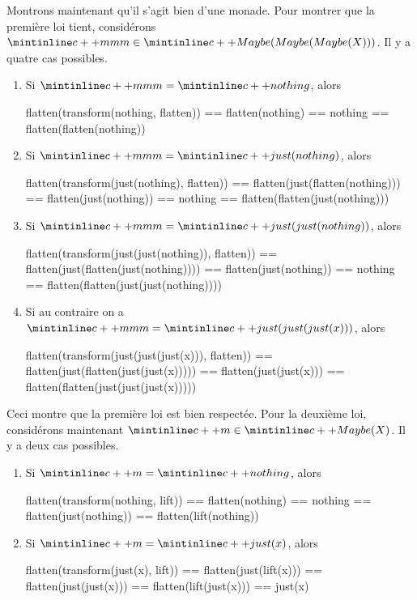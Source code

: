 Montrons maintenant qu'il s'agit bien d'une monade. Pour montrer que la
première loi tient, considérons $\cc{mmm} \in \cc{Maybe(Maybe(Maybe(X)))}$.
Il y a quatre cas possibles.
\begin{enumerate}
    \item Si $\cc{mmm} = \cc{nothing}$, alors
    \begin{cpp}
        flatten(transform(nothing, flatten))
            == flatten(nothing)
            == nothing
            == flatten(flatten(nothing))
    \end{cpp}

    \item Si $\cc{mmm} = \cc{just(nothing)}$, alors
    \begin{cpp}
        flatten(transform(just(nothing), flatten))
            == flatten(just(flatten(nothing)))
            == flatten(just(nothing))
            == nothing
            == flatten(flatten(just(nothing)))
    \end{cpp}

    \item Si $\cc{mmm} = \cc{just(just(nothing))}$, alors
    \begin{cpp}
        flatten(transform(just(just(nothing)), flatten))
            == flatten(just(flatten(just(nothing))))
            == flatten(just(nothing))
            == nothing
            == flatten(flatten(just(just(nothing))))
    \end{cpp}

    \item Si au contraire on a $\cc{mmm} = \cc{just(just(just(x)))}$, alors
    \begin{cpp}
        flatten(transform(just(just(just(x))), flatten))
            == flatten(just(flatten(just(just(x)))))
            == flatten(just(just(x)))
            == flatten(flatten(just(just(just(x)))))
    \end{cpp}
\end{enumerate}

Ceci montre que la première loi est bien respectée. Pour la deuxième loi,
considérons maintenant $\cc{m} \in \cc{Maybe(X)}$. Il y a deux cas possibles.
\begin{enumerate}
    \item Si $\cc{m} = \cc{nothing}$, alors
    \begin{cpp}
        flatten(transform(nothing, lift)) == flatten(nothing)
                                          == nothing
                                          == flatten(just(nothing))
                                          == flatten(lift(nothing))
    \end{cpp}

    \item Si $\cc{m} = \cc{just(x)}$, alors
    \begin{cpp}
        flatten(transform(just(x), lift)) == flatten(just(lift(x)))
                                          == flatten(just(just(x)))
                                          == flatten(lift(just(x)))
                                          == just(x)
    \end{cpp}
\end{enumerate}

